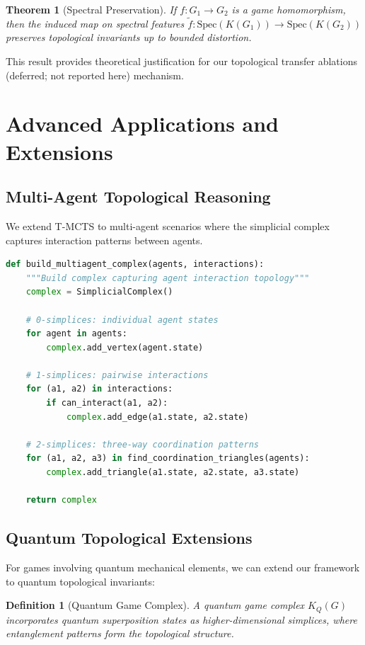 \documentclass{article}
\newtheorem{theorem}{Theorem}
\newtheorem{definition}{Definition}
\begin{document}
\begin{theorem}[Spectral Preservation]
If $f: G_1 \to G_2$ is a game homomorphism, then the induced map on spectral features $\tilde{f}: \text{Spec}(K(G_1)) \to \text{Spec}(K(G_2))$ preserves topological invariants up to bounded distortion.
\end{theorem}

This result provides theoretical justification for our topological transfer ablations (deferred; not reported here) mechanism.

\section{Advanced Applications and Extensions}

\subsection{Multi-Agent Topological Reasoning}

We extend T-MCTS to multi-agent scenarios where the simplicial complex captures interaction patterns between agents.

\begin{lstlisting}[language=Python, caption=Multi-Agent Topological Analysis]
def build_multiagent_complex(agents, interactions):
    """Build complex capturing agent interaction topology"""
    complex = SimplicialComplex()
    
    # 0-simplices: individual agent states
    for agent in agents:
        complex.add_vertex(agent.state)
    
    # 1-simplices: pairwise interactions
    for (a1, a2) in interactions:
        if can_interact(a1, a2):
            complex.add_edge(a1.state, a2.state)
    
    # 2-simplices: three-way coordination patterns
    for (a1, a2, a3) in find_coordination_triangles(agents):
        complex.add_triangle(a1.state, a2.state, a3.state)
    
    return complex
\end{lstlisting}

\subsection{Quantum Topological Extensions}

For games involving quantum mechanical elements, we can extend our framework to quantum topological invariants:

\begin{definition}[Quantum Game Complex]
A quantum game complex $K_Q(G)$ incorporates quantum superposition states as higher-dimensional simplices, where entanglement patterns form the topological structure.
\end{definition}
\end{document}

